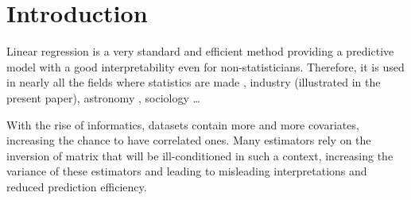 \documentclass[11pt,a4paper]{article}
\begin{document}
\section{Introduction}
Linear regression is a very standard and efficient method providing a predictive model with a good interpretability even  for non-statisticians. Therefore, it is used in nearly all the fields where statistics are made \cite{montgomery2012introduction},  industry (illustrated in the present paper), astronomy \cite{isobe1990linear}, sociology \cite{longford2012revision} \dots

	With the rise of informatics, datasets contain more and more covariates, %
	increasing the chance to have correlated ones.  
		Many estimators rely on the inversion of matrix that will be ill-conditioned in such a context, increasing the variance of these estimators and leading to misleading interpretations and reduced prediction efficiency.
		~\\	~\\
		
\end{document}
